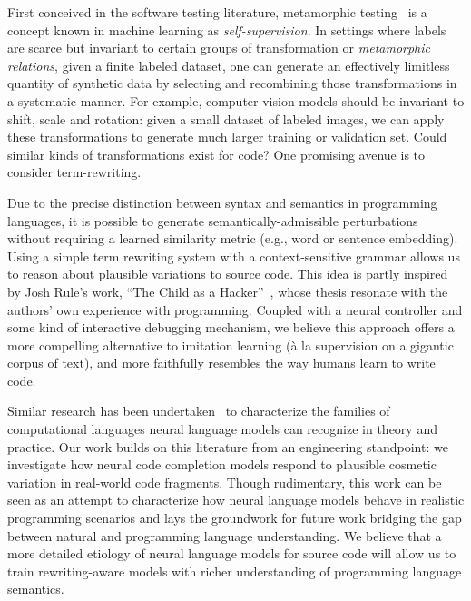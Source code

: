 \documentclass[usenames,dvipsnames]{article} %
\begin{document}
  First conceived in the software testing literature, metamorphic testing~\cite{chen1995metamorphic} is a concept known in machine learning as \textit{self-supervision}. In settings where labels are scarce but invariant to certain groups of transformation or \textit{metamorphic relations}, given a finite labeled dataset, one can generate an effectively limitless quantity of synthetic data by selecting and recombining those transformations in a systematic manner. For example, computer vision models should be invariant to shift, scale and rotation: given a small dataset of labeled images, we can apply these transformations to generate much larger training or validation set. Could similar kinds of transformations exist for code? One promising avenue is to consider term-rewriting.

  Due to the precise distinction between syntax and semantics in programming languages, it is possible to generate semantically-admissible perturbations without requiring a learned similarity metric (e.g., word or sentence embedding). Using a simple term rewriting system with a context-sensitive grammar allows us to reason about plausible variations to source code. This idea is partly inspired by Josh Rule's work, ``The Child as a Hacker''~\citep{rule2020child}, whose thesis resonate with the authors' own experience with programming. Coupled with a neural controller and some kind of interactive debugging mechanism, we believe this approach offers a more compelling alternative to imitation learning (à la supervision on a gigantic corpus of text), and more faithfully resembles the way humans learn to write code.

  Similar research has been undertaken~\citep{weiss2018practical, chirkova2020empirical, chen2021evaluating} to characterize the families of computational languages neural language models can recognize in theory and practice. Our work builds on this literature from an engineering standpoint: we investigate how neural code completion models respond to plausible cosmetic variation in real-world code fragments. Though rudimentary, this work can be seen as an attempt to characterize how neural language models behave in realistic programming scenarios and lays the groundwork for future work bridging the gap between natural and programming language understanding. We believe that a more detailed etiology of neural language models for source code will allow us to train rewriting-aware models with richer understanding of programming language semantics.
\end{document}
